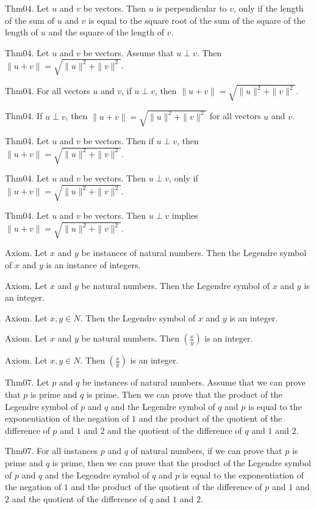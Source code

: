 \documentclass{article}
\begin{document}
Thm04. Let $u$ and $v$ be vectors. Then $u$ is perpendicular to $v$, only if the length of the sum of $u$ and $v$ is equal to the square root of the sum of the square of the length of $u$ and the square of the length of $v$.

Thm04. Let $u$ and $v$ be vectors. Assume that $u \perp v$. Then $\| u + v \| = \sqrt{ \| u \| ^{ 2}+ \| v \| ^{ 2}}$.

Thm04. For all vectors $u$ and $v$, if $u \perp v$, then $\| u + v \| = \sqrt{ \| u \| ^{ 2}+ \| v \| ^{ 2}}$.

Thm04. If $u \perp v$, then $\| u + v \| = \sqrt{ \| u \| ^{ 2}+ \| v \| ^{ 2}}$ for all vectors $u$ and $v$.

Thm04. Let $u$ and $v$ be vectors. Then if $u \perp v$, then $\| u + v \| = \sqrt{ \| u \| ^{ 2}+ \| v \| ^{ 2}}$.

Thm04. Let $u$ and $v$ be vectors. Then $u \perp v$, only if $\| u + v \| = \sqrt{ \| u \| ^{ 2}+ \| v \| ^{ 2}}$.

Thm04. Let $u$ and $v$ be vectors. Then $u \perp v$ implies $\| u + v \| = \sqrt{ \| u \| ^{ 2}+ \| v \| ^{ 2}}$.

Axiom. Let $x$ and $y$ be instances of natural numbers. Then the Legendre symbol of $x$ and $y$ is an instance of integers.

Axiom. Let $x$ and $y$ be natural numbers. Then the Legendre symbol of $x$ and $y$ is an integer.

Axiom. Let $x , y \in N$. Then the Legendre symbol of $x$ and $y$ is an integer.

Axiom. Let $x$ and $y$ be natural numbers. Then $\left(\frac{ x }{ y }\right)$ is an integer.

Axiom. Let $x , y \in N$. Then $\left(\frac{ x }{ y }\right)$ is an integer.

Thm07. Let $p$ and $q$ be instances of natural numbers. Assume that we can prove that $p$ is prime and $q$ is prime. Then we can prove that the product of the Legendre symbol of $p$ and $q$ and the Legendre symbol of $q$ and $p$ is equal to the exponentiation of the negation of $1$ and the product of the quotient of the difference of $p$ and $1$ and $2$ and the quotient of the difference of $q$ and $1$ and $2$.

Thm07. For all instances $p$ and $q$ of natural numbers, if we can prove that $p$ is prime and $q$ is prime, then we can prove that the product of the Legendre symbol of $p$ and $q$ and the Legendre symbol of $q$ and $p$ is equal to the exponentiation of the negation of $1$ and the product of the quotient of the difference of $p$ and $1$ and $2$ and the quotient of the difference of $q$ and $1$ and $2$.
\end{document}
